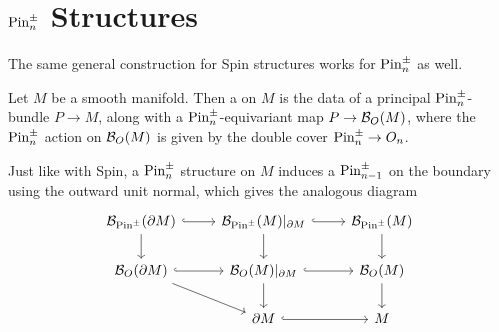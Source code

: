 %
\section{$\mathrm{Pin}^\pm_n$ Structures}
%
The same general construction for Spin structures works for $\mathrm{Pin}^\pm_n$ as well.
%
\begin{defn}
Let $M$ be a smooth manifold. Then a  on $M$ is the
data of a principal $\mathrm{Pin}_n^\pm$-bundle $P \to M$, along with a
$\mathrm{Pin}^\pm_n$-equivariant map $P \to \mathcal{B}_O(M)$, where the $\mathrm{Pin}^\pm_n$ action on
$\mathcal{B}_O(M)$ is given by the double cover $\mathrm{Pin}^\pm_n \to O_n$.
\end{defn}
%
Just like with Spin, a $\mathrm{Pin}^\pm_n$ structure on $M$ induces a $\mathrm{Pin}^\pm_{n-1}$
on the boundary using the outward unit normal, which gives the analogous diagram
\[\begin{tikzcd}
\B_{\Pin^\pm}(\partial M) \ar[d]\ar[r, hookrightarrow] & \B_{\Pin^\pm}(M)\vert_{\partial M}
\ar[d]\ar[r, hookrightarrow] & \B_{\Pin^\pm}(M) \ar[d]\\
\B_O(\partial M) \ar[dr]\ar[r, hookrightarrow] & \B_O(M)\vert_{\partial M}
\ar[d]\ar[r, hookrightarrow] & \B_O(M) \ar[d]\\
& \partial M \ar[r, hookrightarrow]& M
\end{tikzcd}\]
%
